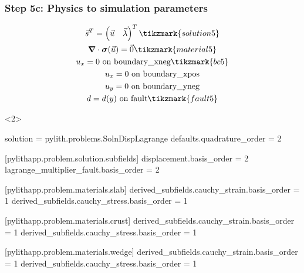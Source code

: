 \documentclass[aspectratio=169]{beamer}
\begin{document}
\begin{frame}[t,fragile]
  \frametitle{Step 5c: Physics to simulation parameters}
  \summary{}

  \begin{minipage}[t]{0.3\textwidth}
    {\scriptsize
    \begin{gather*}
    \vec{s}^T = \left( \vec{u} \quad \vec{\lambda} \right)^T \tikzmark{solution5}\\
    \tensor{\nabla} \cdot \tensor{\sigma}(\vec{u}) = \vec{0} \tikzmark{material5}\\
    u_x = 0 \text{ on boundary\_xneg} \tikzmark{bc5}\\
    u_x = 0 \text{ on boundary\_xpos} \\
    u_y = 0 \text{ on boundary\_yneg} \\
    d = d(y) \text{ on fault} \tikzmark{fault5}
    \end{gather*}}
  \end{minipage}
  \hfill
  \begin{minipage}[t]{0.67\textwidth}
    \begin{onlyenv}<2>
      \begin{cfgcode}
        solution = pylith.problems.SolnDispLagrange
        defaults.quadrature_order = 2

        [pylithapp.problem.solution.subfields]
        displacement.basis_order = 2
        lagrange_multiplier_fault.basis_order = 2

        [pylithapp.problem.materials.slab]
        derived_subfields.cauchy_strain.basis_order = 1
        derived_subfields.cauchy_stress.basis_order = 1

        [pylithapp.problem.materials.crust]
        derived_subfields.cauchy_strain.basis_order = 1
        derived_subfields.cauchy_stress.basis_order = 1

        [pylithapp.problem.materials.wedge]
        derived_subfields.cauchy_strain.basis_order = 1
        derived_subfields.cauchy_stress.basis_order = 1
      \end{cfgcode}
    \end{onlyenv}
  \end{minipage}

  
\end{frame}
\end{document}
